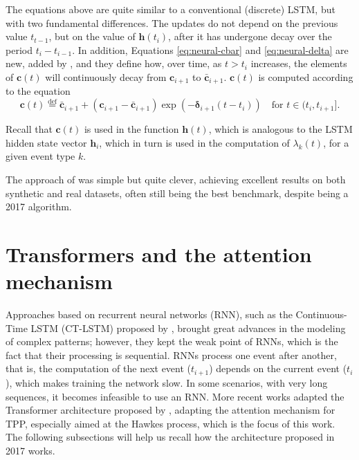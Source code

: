     The equations above are quite similar to a conventional (discrete) LSTM, but with two fundamental differences. The updates do not depend on the previous value $t_{t-1}$, but on the value of $\mathbf{h}(t_i)$, after it has undergone decay over the period $t_i-t_{i-1}$. In addition, Equations \ref{eq:neural-cbar} and \ref{eq:neural-delta} are new, added by , and they define how, over time, as $t>t_i$ increases, the elements of $\mathbf{c}(t)$ will continuously decay from $\mathbf{c}_{i+1}$ to $\mathbf{\bar{c}}_{i+1}$. $\mathbf{c}(t)$ is computed according to the equation
    \begin{equation}
        \mathbf{c}(t) \overset{\text{def}}{=} \mathbf{\bar{c}}_{i+1} + (\mathbf{c}_{i+1}-\mathbf{\bar{c}}_{i+1}) \exp(-\mathbf{\delta}_{i+1}(t-t_i)) \quad \text{for } t \in (t_i,t_{i+1}].
        \label{eq:neural-ct}
    \end{equation}

    Recall that $\mathbf{c}(t)$ is used in the function $\mathbf{h}(t)$, which is analogous to the LSTM hidden state vector $\mathbf{h}_i$, which in turn is used in the computation of $\lambda_k(t)$, for a given event type $k$.

    The approach of  was simple but quite clever, achieving excellent results on both synthetic and real datasets, often still being the best benchmark, despite being a 2017 algorithm.

\section{Transformers and the attention mechanism}\label{sec:transformers-atencao}

    Approaches based on recurrent neural networks (RNN), such as the Continuous-Time LSTM (CT-LSTM) proposed by , brought great advances in the modeling of complex patterns; however, they kept the weak point of RNNs, which is the fact that their processing is sequential. RNNs process one event after another, that is, the computation of the next event ($t_{i+1}$) depends on the current event ($t_i$), which makes training the network slow. In some scenarios, with very long sequences, it becomes infeasible to use an RNN. More recent works adapted the Transformer architecture proposed by , adapting the attention mechanism for TPP, especially aimed at the Hawkes process, which is the focus of this work. The following subsections will help us recall how the architecture proposed in 2017 works.

